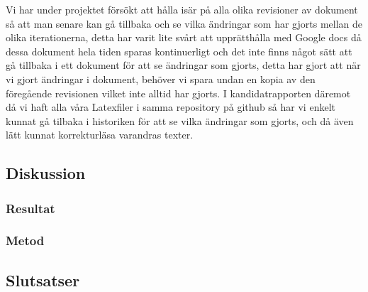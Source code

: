 Vi har under projektet försökt att hålla isär på alla olika revisioner av dokument så att man senare kan gå tillbaka och se vilka ändringar som har gjorts mellan de olika iterationerna, detta har varit lite svårt att upprätthålla med Google docs då dessa dokument hela tiden sparas kontinuerligt och det inte finns något sätt att gå tillbaka i ett dokument för att se ändringar som gjorts, detta har gjort att när vi gjort ändringar i dokument, behöver vi spara undan en kopia av den föregående revisionen vilket inte alltid har gjorts. I kandidatrapporten däremot då vi haft alla våra Latexfiler i samma repository på github så har vi enkelt kunnat gå tilbaka i historiken för att se vilka ändringar som gjorts, och då även lätt kunnat korrekturläsa varandras texter.
\subsection{Diskussion}
\subsubsection{Resultat}
\subsubsection{Metod}
\subsection{Slutsatser}
